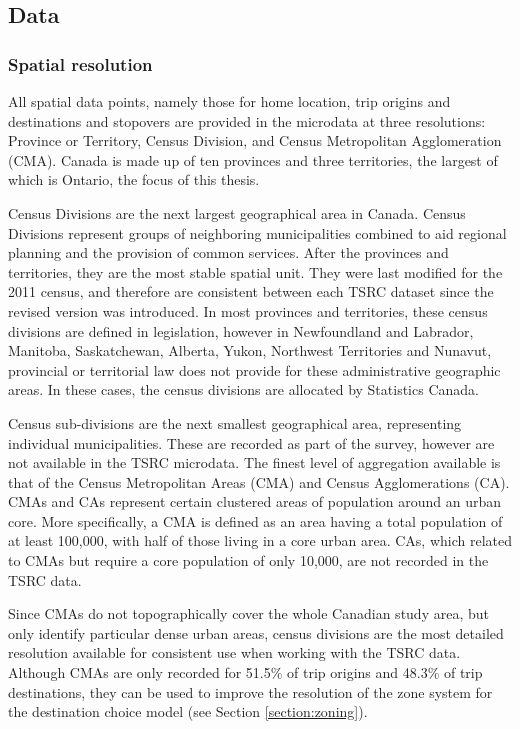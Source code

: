 \subsection{Data}
\label{section:tsrcdata}
\subsubsection{Spatial resolution}
All spatial data points, namely those for home location, trip origins and destinations and stopovers are provided in the microdata at three resolutions: Province or Territory, Census Division, and Census Metropolitan Agglomeration (CMA). Canada is made up of ten provinces and three territories, the largest of which is Ontario, the focus of this thesis. 

Census Divisions are the next largest geographical area in Canada. Census Divisions represent groups of neighboring municipalities combined to aid regional planning and the provision of common services. After the provinces and territories, they are the most stable spatial unit. They were last modified for the 2011 census, and therefore are consistent between each TSRC dataset since the revised version was introduced. In most provinces and territories, these census divisions are defined in legislation, however in Newfoundland and Labrador, Manitoba, Saskatchewan, Alberta, Yukon, Northwest Territories and Nunavut, provincial or territorial law does not provide for these administrative geographic areas. In these cases, the census divisions are allocated by Statistics Canada.

Census sub-divisions are the next smallest geographical area, representing individual municipalities. These are recorded as part of the survey, however are not available in the TSRC microdata. The finest level of aggregation available is that of the Census Metropolitan Areas (CMA) and Census Agglomerations (CA). CMAs and CAs represent certain clustered areas of population around an urban core. More specifically, a CMA is defined as an area having a total population of at least 100,000, with half of those living in a core urban area. CAs, which related to CMAs but require a core population of only 10,000, are not recorded in the TSRC data. 

Since CMAs do not topographically cover the whole Canadian study area, but only identify particular dense urban areas, census divisions are the most detailed resolution available for consistent use when working with the TSRC data. Although CMAs are only recorded for 51.5\% of trip origins and 48.3\% of trip destinations, they can be used to improve the resolution of the zone system for the destination choice model (see Section \ref{section:zoning}).

